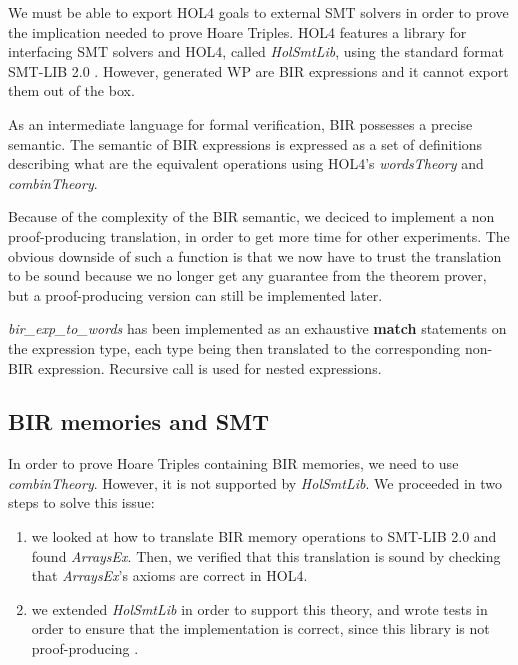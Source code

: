 \documentclass[10pt,a4paper]{article}
\begin{document}
\begin{multicols}{2}
We must be able to export HOL4 goals to external SMT solvers in order to prove the implication needed to prove Hoare Triples. HOL4 features a library for interfacing {SMT} solvers and HOL4, called \textit{HolSmtLib}, using the standard format SMT-LIB 2.0 \cite{barrett_satisfiability_2016}. However, generated WP are BIR expressions and it cannot export them out of the box.

As an intermediate language for formal verification, {BIR} possesses a precise semantic. The semantic of BIR expressions is expressed as a set of definitions describing what are the equivalent operations using HOL4's \textit{wordsTheory} and \textit{combinTheory}.

Because of the complexity of the BIR semantic, we deciced to implement a non proof-producing translation, in order to get more time for other experiments. The obvious downside of such a function is that we now have to trust the translation to be sound because we no longer get any guarantee from the theorem prover, but a proof-producing version can still be implemented later.

\textit{bir\_exp\_to\_words} has been implemented as an exhaustive \textbf{match} statements on the expression type, each type being then translated to the corresponding non-BIR expression. Recursive call is used for nested expressions.

\subsection{BIR memories and SMT} \label{bir-memories-with-smt-solvers}

In order to prove Hoare Triples containing BIR memories, we need to use \textit{combinTheory}. However, it is not supported by \textit{HolSmtLib}. We proceeded in two steps to solve this issue:

\begin{enumerate}
  \item we looked at how to translate BIR memory operations to SMT-LIB 2.0 and found \textit{ArraysEx}. Then, we verified that this translation is sound by checking that \textit{ArraysEx}'s axioms are correct in HOL4.
  \item we extended \textit{HolSmtLib} in order to support this theory, and wrote tests in order to ensure that the implementation is correct, since this library is not proof-producing \footnotemark.
\end{enumerate}



\end{multicols}
\end{document}
